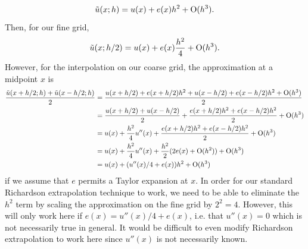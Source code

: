 \documentclass{article}
\begin{document}
\[
\Tilde{u}(x;h)=u(x)+e(x)h^2+\operatorname{O}(h^3).
\]
Then, for our fine grid,
\[
\Tilde{u}(x;h/2)=u(x)+e(x)\frac{h^2}{4}+\operatorname{O}(h^3).
\]
However, for the interpolation on our coarse grid, the approximation at a midpoint $x$ is 
\begin{align*}
\frac{\Tilde{u}(x+h/2;h)+\Tilde{u}(x-h/2;h)}{2}&=\frac{u(x+h/2)+e(x+h/2)h^2+u(x-h/2)+e(x-h/2)h^2+\operatorname{O}(h^3)}{2}\\&=
\frac{u(x+h/2)+u(x-h/2)}{2}+\frac{e(x+h/2)h^2+e(x-h/2)h^2}{2}+\operatorname{O}(h^3)\\&=
u(x)+\frac{h^2}{4}u''(x)+\frac{e(x+h/2)h^2+e(x-h/2)h^2}{2}+\operatorname{O}(h^3)\\&=
u(x)+\frac{h^2}{4}u''(x)+\frac{h^2}{2}(2e(x)+\operatorname{O}(h^2))+\operatorname{O}(h^3)\\&=
u(x)+(u''(x)/4+e(x))h^2+\operatorname{O}(h^3)
\end{align*}
if we assume that $e$ permits a Taylor expansion at $x$. In order for our standard Richardson extrapolation technique to work, we need to be able to eliminate the $h^2$ term by scaling the approximation on the fine grid by $2^2=4$. However, this will only work here if $e(x)=u''(x)/4+e(x)$, i.e. that $u''(x)=0$ which is not necessarily true in general. It would be difficult to even modify Richardson extrapolation to work here since $u''(x)$ is not necessarily known.
\end{document}
